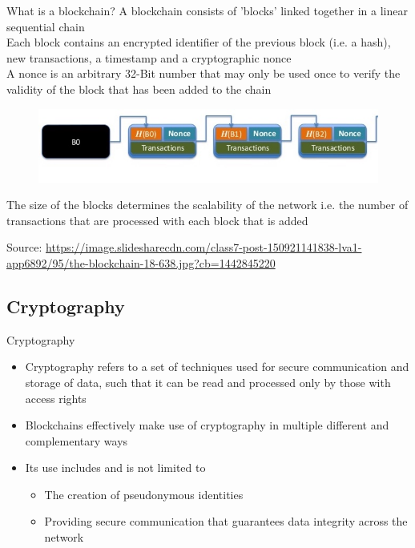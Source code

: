 \documentclass[10pt]{beamer}
\begin{document}
\begin{frame}{What is a blockchain?}
	A blockchain consists of 'blocks' linked together in a linear sequential chain\\ \vspace{3mm}
	Each block contains an encrypted identifier of the previous block (i.e. a hash), new transactions, a timestamp and a cryptographic nonce\\ \vspace{3mm}
	A nonce is an arbitrary 32-Bit number that may only be used once to verify the validity of the block that has been added to the chain
	\begin{figure}[]
		\centering
		\includegraphics  [width=3.in]{Images/blockchain1}
	\end{figure}
	The size of the blocks determines the scalability of the network i.e. the number of transactions that are processed with each block that is added\\ \vspace{3mm}
	\begin{tiny}
		Source: \href{https://www.slideshare.net/DavidEvansUVa/the-blockchain}{https://image.slidesharecdn.com/class7-post-150921141838-lva1-app6892/95/the-blockchain-18-638.jpg?cb=1442845220}
	\end{tiny}
\end{frame}

\subsection{Cryptography}

\begin{frame}{Cryptography}
	\begin{itemize}
		\item Cryptography refers to a set of techniques used for secure communication and storage of data, such that it can be read and processed only by those with access rights
		\item Blockchains effectively make use of cryptography in multiple different and complementary ways
		\item Its use includes and is not limited to
		\begin{itemize}
			\item The creation of pseudonymous identities
			\item Providing secure communication that guarantees data integrity across the network
		\end{itemize}
	\end{itemize}
\end{frame}
\end{document}
